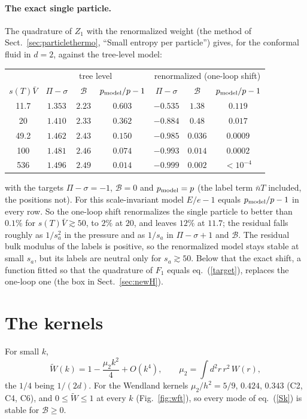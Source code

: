 \documentclass[11pt,aps,preprint,nofootinbib,superscriptaddress,tightenlines]{revtex4-2}
\newcommand{\klab}{\mathcal B}
\def\st{\begin{equation}}
\def\stp{\end{equation}}
\def\Eq#1{eq.~(\ref{#1})}
\def\Sect#1{Sect.~\ref{#1}}
\def\Fig#1{Fig.~\ref{#1}}
\let\oldparagraph\paragraph
\renewcommand{\paragraph}{\par\bigskip\oldparagraph}
\begin{document}
\paragraph{The exact single particle.}  The quadrature of $Z_1$ with the renormalized weight (the method of \Sect{sec:particlethermo}, ``Small entropy per particle'')
gives, for the conformal fluid in $d=2$, against the tree-level model:
\begin{center}
\begin{tabular}{c ccc ccc}
\toprule
 & \multicolumn{3}{c}{tree level} & \multicolumn{3}{c}{renormalized (one-loop shift)} \\
$s(T)\bar V$ & $\Pi-\sigma$ & $\klab$ & $p_{\rm model}/p-1$ & $\Pi-\sigma$ & $\klab$ & $p_{\rm model}/p-1$ \\
\midrule
11.7 & $1.353$ & $2.23$ & $0.603$ & $-0.535$ & $1.38$ & $0.119$ \\
20   & $1.410$ & $2.33$ & $0.362$ & $-0.884$ & $0.48$ & $0.017$ \\
49.2 & $1.462$ & $2.43$ & $0.150$ & $-0.985$ & $0.036$ & $0.0009$ \\
100  & $1.481$ & $2.46$ & $0.074$ & $-0.993$ & $0.014$ & $0.0002$ \\
536  & $1.496$ & $2.49$ & $0.014$ & $-0.999$ & $0.002$ & $<10^{-4}$ \\
\bottomrule
\end{tabular}
\end{center}
with the targets $\Pi-\sigma=-1$, $\klab=0$ and $p_{\rm model}=p$ (the label term $\bar nT$ included, the positions not).  For this scale-invariant model $E/e-1$ equals
$p_{\rm model}/p-1$ in every row.  So the one-loop shift renormalizes the single particle to better than $0.1\%$ for $s(T)\bar V\gtrsim50$, to $2\%$ at $20$, and leaves $12\%$ at
$11.7$; the residual falls roughly as $1/s_a^2$ in the pressure and as $1/s_a$ in $\Pi-\sigma+1$ and $\klab$.  The residual bulk modulus of the labels is positive, so the
renormalized model stays stable at small $s_a$, but its labels are neutral only for $s_a\gtrsim50$.  Below that the exact shift, a function fitted so that the quadrature
of $F_1$ equals \Eq{target}, replaces the one-loop one (the box in \Sect{sec:newH}).

\section{The kernels}
\label{app:kernels}

For small $k$,
\st
\widetilde W(k)=1-\frac{\mu_2k^2}{4}+O(k^4),\qquad \mu_2=\int d^2r\,r^2\,W(r),
\stp
the $1/4$ being $1/(2d)$.  For the Wendland kernels $\mu_2/h^2=5/9$, $0.424$, $0.343$ (C2, C4, C6), and $0\le\widetilde W\le1$ at every $k$ (\Fig{fig:wft}), so every mode
of \Eq{Sk} is stable for $\klab\ge0$.
\end{document}
